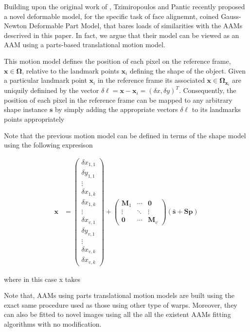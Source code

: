 Building upon the original work of \cite{}, Tzimiropoulos and Pantic \cite{} recently proposed a novel deformable model, for the specific task of face alignemnt, coined Gauss-Newton Deformable Part Model, that bares loads of similarities with the AAMs descrived in this paper. In fact, we argue that their model can be viewed as an AAM using a parts-based translational motion model.

This motion model defines the position of each pixel on the reference frame, $\mathbf{x} \in \mathbf{\Omega}$, relative to the landmark points $\mathbf{x}_i$ defining the shape of the object. Given a particular landmark point $\mathbf{x}_i$ in the reference frame its associated $\mathbf{x} \in \mathbf{\Omega}_{\mathbf{x}_i}$ are uniquily definined by the vector $\delta \boldsymbol{\ell} = \mathbf{x} - \mathbf{x}_i = (\delta x, \delta y)^T$. Consequently, the position of each pixel in the reference frame can be mapped to any arbitrary shape instance $\mathbf{s}$ by simply adding the appropriate vectors $\delta \mathbf{\ell}$ to its landmarks points appropriately

Note that the previous motion model can be defined in terms of the shape model using the following expresison

\begin{equation}
	\begin{aligned}
		\mathbf{x} & = 
        	\begin{pmatrix}
				\delta x_{1,1}
                \\
                \delta y_{1,1}
                \\ 
                \vdots
				\\ 
                \delta x_{1,k}
                \\
                \delta x_{1,k}
                \\
                \vdots
				\\ 
                \delta x_{v,1}
                \\
                \delta y_{v,1}
                \\ 
                \vdots
				\\ 
                \delta x_{v,k}
                \\
                \delta x_{v,k}
			\end{pmatrix} 
            + 
            \begin{pmatrix}
				\mathbf{M}_1 & \cdots & \mathbf{0}
                \\
                \vdots & \ddots & \vdots
                \\
                \mathbf{0} & \cdots & \mathbf{M}_v
			\end{pmatrix} \left(\bar{\mathbf{s}} + \mathbf{S} \mathbf{p} \right)
	\end{aligned}
    \label{eq:subspace_warp}
\end{equation}


where in this case x takes


Note that, AAMs using parts translational motion models are built using the exact same procedure used  as those using other type of warps. Moreover, they can also be fitted to novel images using all the all the existent AAMs fitting algorithms with no modification.

